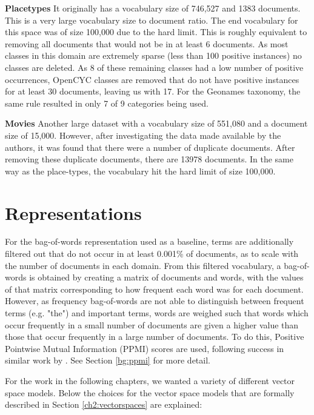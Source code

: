 \textbf{Placetypes} It originally has a vocabulary size of 746,527 and 1383 documents. This is a very large vocabulary size to document ratio. The end vocabulary for this space was of size 100,000 due to the hard limit. This is roughly equivalent to removing all documents that would not be in at least 6 documents. As most classes in this domain are extremely sparse (less than 100 positive instances) no classes are deleted. As 8 of these remaining classes had a low number of positive occurrences, OpenCYC classes are removed that do not have positive instances for at least 30 documents, leaving us with 17. For the Geonames taxonomy, the same rule resulted in only 7 of 9 categories being used.

\textbf{Movies} Another large dataset with a vocabulary size of 551,080 and a document size of 15,000. However, after investigating the data made available by the authors, it was found that there were a number of duplicate documents. After removing these duplicate documents, there are 13978 documents. In the same way as the place-types, the vocabulary hit the hard limit of size 100,000. 



\section{Representations}\label{ch25:reps}

For the bag-of-words representation used as a baseline, terms are additionally filtered out that do not occur in at least 0.001\% of documents, as to scale with the number of documents in each domain. From this filtered vocabulary, a bag-of-words is obtained by creating a matrix of documents and words, with  the values of that matrix corresponding to how frequent each word was for each document. However, as frequency bag-of-words are not able to distinguish between frequent terms (e.g. "the") and important terms, words are weighed such that words which occur frequently in a small number of documents are given a higher value than those that occur frequently in a large number of documents. To do this, Positive Pointwise Mutual Information (PPMI) scores are used, following success in similar work by \cite{Derrac2015}. See Section \ref{bg:ppmi} for more detail.

For the work in the following chapters, we wanted a variety of different vector space models. Below the choices for the vector space models that are formally described in Section \ref{ch2:vectorspaces} are explained:

